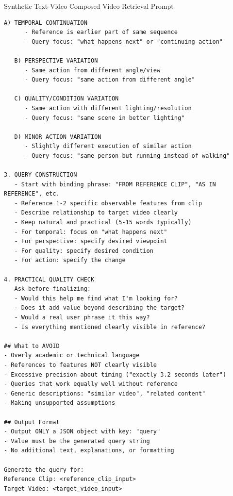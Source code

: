 \begin{promptbox}{Synthetic Text-Video Composed Video Retrieval Prompt}
\begin{lstlisting}[style=promptstyle]
   A) TEMPORAL CONTINUATION
      - Reference is earlier part of same sequence
      - Query focus: "what happens next" or "continuing action"
   
   B) PERSPECTIVE VARIATION
      - Same action from different angle/view
      - Query focus: "same action from different angle"
   
   C) QUALITY/CONDITION VARIATION
      - Same action with different lighting/resolution
      - Query focus: "same scene in better lighting"
   
   D) MINOR ACTION VARIATION
      - Slightly different execution of similar action
      - Query focus: "same person but running instead of walking"

3. QUERY CONSTRUCTION
   - Start with binding phrase: "FROM REFERENCE CLIP", "AS IN REFERENCE", etc.
   - Reference 1-2 specific observable features from clip
   - Describe relationship to target video clearly
   - Keep natural and practical (5-15 words typically)
   - For temporal: focus on "what happens next"
   - For perspective: specify desired viewpoint
   - For quality: specify desired condition
   - For action: specify the change

4. PRACTICAL QUALITY CHECK
   Ask before finalizing:
   - Would this help me find what I'm looking for?
   - Does it add value beyond describing the target?
   - Would a real user phrase it this way?
   - Is everything mentioned clearly visible in reference?

## What to AVOID
- Overly academic or technical language
- References to features NOT clearly visible
- Excessive precision about timing ("exactly 3.2 seconds later")
- Queries that work equally well without reference
- Generic descriptions: "similar video", "related content"
- Making unsupported assumptions

## Output Format
- Output ONLY a JSON object with key: "query"
- Value must be the generated query string
- No additional text, explanations, or formatting

Generate the query for:
Reference Clip: <reference_clip_input>
Target Video: <target_video_input>
\end{lstlisting}
\end{promptbox}

